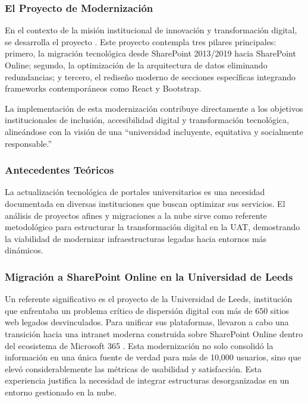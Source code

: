\subsubsection*{El Proyecto de Modernización}

En el contexto de la misión institucional de innovación y transformación digital, se desarrolla el proyecto \textbf{\NombreProyecto}. Este proyecto contempla tres pilares principales: primero, la migración tecnológica desde SharePoint 2013/2019 hacia SharePoint Online; segundo, la optimización de la arquitectura de datos eliminando redundancias; y tercero, el rediseño moderno de secciones específicas integrando frameworks contemporáneos como React y Bootstrap.

La implementación de esta modernización contribuye directamente a los objetivos institucionales de inclusión, accesibilidad digital y transformación tecnológica, alineándose con la visión de una ``universidad incluyente, equitativa y socialmente responsable.''

\subsubsection{Antecedentes Teóricos}
\label{subsec:antecedentes_teoricos}

La actualización tecnológica de portales universitarios es una necesidad documentada en diversas instituciones que buscan optimizar sus servicios. El análisis de proyectos afines y migraciones a la nube sirve como referente metodológico para estructurar la transformación digital en la UAT, demostrando la viabilidad de modernizar infraestructuras legadas hacia entornos más dinámicos.

\subsubsection*{Migración a SharePoint Online en la Universidad de Leeds}

Un referente significativo es el proyecto de la Universidad de Leeds, institución que enfrentaba un problema crítico de dispersión digital con más de 650 sitios web legados desvinculados. Para unificar sus plataformas, llevaron a cabo una transición hacia una intranet moderna construida sobre SharePoint Online dentro del ecosistema de Microsoft 365 \cite{caseleeds2021}. Esta modernización no solo consolidó la información en una única fuente de verdad para más de 10,000 usuarios, sino que elevó considerablemente las métricas de usabilidad y satisfacción. Esta experiencia justifica la necesidad de integrar estructuras desorganizadas en un entorno gestionado en la nube.


